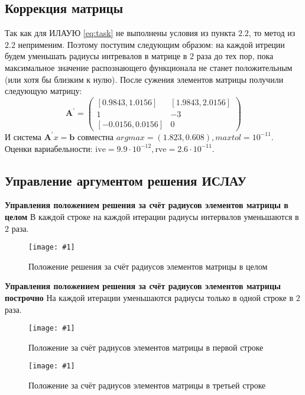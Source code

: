 \documentclass[a4paper,12pt]{article}
\newcommand{\plot}[3]{
    \begin{figure}[H]
        \texttt{[image: \#1]}
        \caption{#2}
        \label{#3}
    \end{figure}
}
\begin{document}
    \subsection{Коррекция матрицы}
    Так как для ИЛАУЮ \ref{eq:task} не выполнены условия из пункта $ 2.2 $, то метод из $ 2.2 $ неприменим.
    Поэтому поступим следующим образом: на каждой итреции будем уменьшать радиусы интревалов в матрице в $ 2 $ раза до тех пор, пока максимальное значение распознающего функционала не станет положительным (или хотя бы близким к нулю).
    После сужения элементов матрицы получили следующую матрицу:
    \begin{equation}
        \textbf{A}^{'} = \begin{pmatrix}
            [0.9843, 1.0156] & [1.9843, 2.0156] \\
            1 & -3 \\
            [-0.0156, 0.0156] & 0
        \end{pmatrix}
    \end{equation}
    И система $ \textbf{A}^{'}x = \textbf{b} $ совместна $ argmax = (1.823, 0.608), maxtol = 10^{-11} $. \newline
    Оценки вариабельности: \newline
    $ \text{ive} = 9.9 \cdot 10^{-12}, \text{rve} = 2.6 \cdot 10^{-11} $.

    \subsection{Управление аргументом решения ИСЛАУ}
    \textbf{Управления положением решения за счёт радиусов элементов матрицы в целом} \newline
    В каждой строке на каждой итерации радиусы интервалов уменьшаются в $ 2 $ раза.
    \plot{MatrixCorrection}{Положение решения за счёт радиусов элементов матрицы в целом}{p:matrixcorrection}

    \noindent
    \textbf{Управления положением решения за счёт радиусов элементов матрицы построчно} \newline
    На каждой итерации уменьшаются радиусы только в одной строке в $ 2 $ раза.
    \plot{MatrixCorrectionByLine0}{Положение за счёт радиусов элементов матрицы в первой строке}{p:matrixcorrectionbyline0}
    \plot{MatrixCorrectionByLine2}{Положение за счёт радиусов элементов матрицы в третьей строке}{p:matrixcorrectionbyline2}
\end{document}
